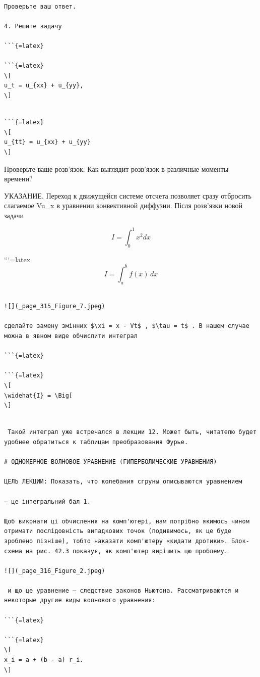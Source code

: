 \documentclass[
  ukrainian,
]{article}
\begin{document}
\begin{verbatim}

Проверьте ваш ответ.

4. Решите задачу

```{=latex}

```{=latex}
\[
u_t = u_{xx} + u_{yy},
\]
\end{verbatim}

\begin{verbatim}

```{=latex}
\[
u_{tt} = u_{xx} + u_{yy}
\]
\end{verbatim}

Проверьте ваше розв'язок. Как выглядит розв'язок в различные моменты
времени?

УКАЗАНИЕ. Переход к движущейся системе отсчета позволяет сразу отбросить
слагаемое Vu\_x в уравнении конвективной диффузии. Після розв'язки новой
задачи

\[
I = \int_0^1 x^2 dx
\]

```{=latex}
\[
I = \int_{a}^{b} f(x) \, dx
\]

\begin{verbatim}

![](_page_315_Figure_7.jpeg)

сделайте замену змінних $\xi = x - Vt$ , $\tau = t$ . В нашем случае можна в явном виде обчислити интеграл

```{=latex}

```{=latex}
\[
\widehat{I} = \Big[
\]
\end{verbatim}

\begin{verbatim}

 Такой интеграл уже встречался в лекции 12. Может быть, читателю будет удобнее обратиться к таблицам преобразования Фурье.

# ОДНОМЕРНОЕ ВОЛНОВОЕ УРАВНЕНИЕ (ГИПЕРБОЛИЧЕСКИЕ УРАВНЕНИЯ)

ЦЕЛЬ ЛЕКЦИИ: Показать, что колебания сгруны описываются уравнением

— це інтегральний бал 1.

Щоб виконати ці обчислення на комп'ютері, нам потрібно якимось чином отримати послідовність випадкових точок (подивимось, як це буде зроблено пізніше), тобто наказати комп'ютеру «кидати дротики». Блок-схема на рис. 42.3 показує, як комп'ютер вирішить цю проблему.

![](_page_316_Figure_2.jpeg)

 и що це уравнение — следствие законов Ньютона. Рассматриваются и некоторые другие виды волнового уравнения:

```{=latex}

```{=latex}
\[
x_i = a + (b - a) r_i.
\]
\end{verbatim}
\end{document}
